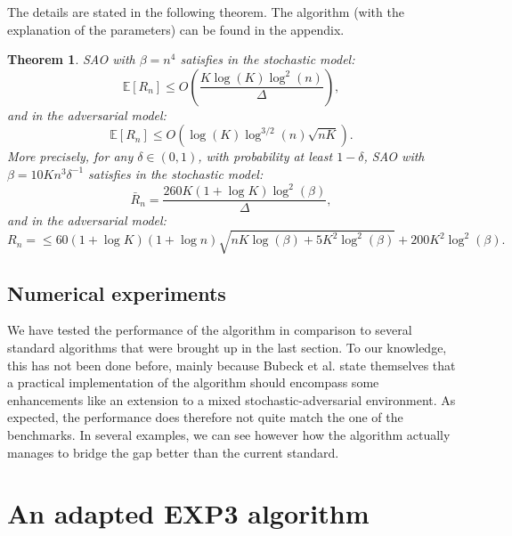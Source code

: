\documentclass[11pt]{article}
\newtheorem{theorem}{Theorem}
\begin{document}
The details are stated in the following theorem. The algorithm (with the explanation of the parameters) can be found in the appendix.
\begin{theorem}
SAO with $\beta = n^4$ satisfies in the stochastic model:
$$ \mathbb{E}[R_n] \leq O \left (\frac{K \log(K) \log^2(n)}{\Delta} \right),$$
and in the adversarial model:
$$\mathbb{E}[R_n] \leq O(\log(K) \log^{3/2}(n) \sqrt{nK}).$$
More precisely, for any $\delta \in (0,1)$, with probability at least $1-\delta$, SAO with $\beta = 10Kn^3 \delta^{-1}$ satisfies in the stochastic model:
$$\bar{R}_n = \frac{260K (1 + \log K) \log^2(\beta)}{\Delta},$$
and in the adversarial model:
$$R_n = \leq 60(1 + \log K) (1 + \log n) \sqrt{nK \log(\beta) + 5 K^2 \log^2(\beta)} + 200K^2 \log^2(\beta).$$
\end{theorem}

\subsection*{Numerical experiments}

We have tested the performance of the algorithm in comparison to several standard algorithms that were brought up in the last section. To our knowledge, this has not been done before, mainly because Bubeck et al. state themselves that a practical implementation of the algorithm should encompass some enhancements like an extension to a mixed stochastic-adversarial environment. As expected, the performance does therefore not quite match the one of the benchmarks. In several examples, we can see however how the algorithm actually manages to bridge the gap better than the current standard.


\section*{An adapted EXP3 algorithm}
\end{document}
